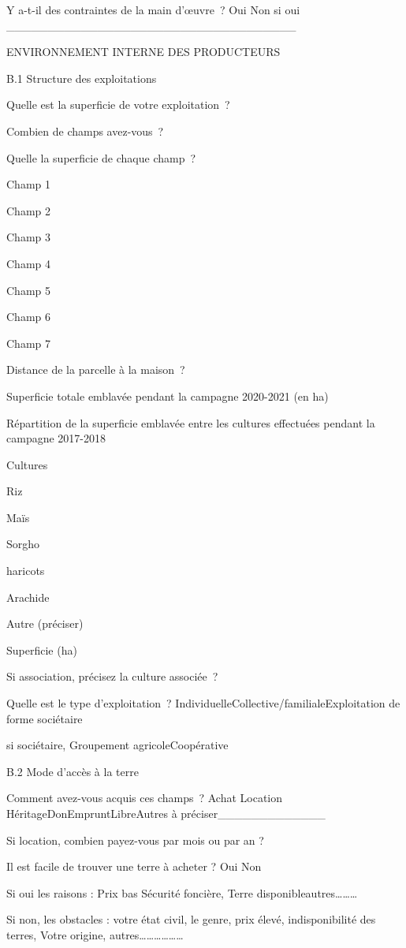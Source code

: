 \documentclass[12pt,oneside]{report}
\begin{document}
Y a-t-il des contraintes de la main d’œuvre ? Oui  Non si oui \_\_\_\_\_\_\_\_\_\_\_\_\_\_\_\_\_\_\_\_\_\_\_\_\_\_\_\_\_\_\_\_\_\_\_

ENVIRONNEMENT INTERNE DES PRODUCTEURS

B.1 Structure des exploitations

Quelle est la superficie de votre exploitation ?

Combien de champs avez-vous ?

Quelle la superficie de chaque champ ?

Champ 1

Champ 2

Champ 3

Champ 4

Champ 5

Champ 6

Champ 7

Distance de la parcelle à la maison ?

Superficie totale emblavée pendant la campagne 2020-2021 (en ha)

Répartition de la superficie emblavée entre les cultures effectuées pendant la campagne 2017-2018

Cultures

Riz

Maïs

Sorgho

haricots

Arachide

Autre (préciser)

Superficie (ha)

Si association, précisez la culture associée ?

Quelle est le type d’exploitation ? IndividuelleCollective/familialeExploitation de forme sociétaire

si sociétaire,  Groupement agricoleCoopérative

B.2 Mode d’accès à la terre

Comment avez-vous acquis ces champs ? Achat Location  HéritageDonEmpruntLibreAutres à préciser\_\_\_\_\_\_\_\_\_\_\_\_\_

Si location, combien payez-vous par mois ou par an ?

Il est facile de trouver une terre à acheter ? Oui  Non

Si oui  les raisons : Prix bas  Sécurité foncière, Terre disponibleautres………

Si non,  les obstacles : votre état civil, le genre, prix élevé,  indisponibilité des terres,  Votre origine,  autres………………
\end{document}

